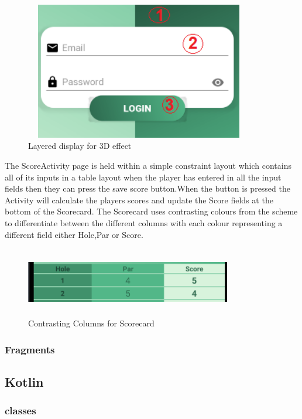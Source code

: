 \begin{figure}[H]
    \centering
    \includegraphics[width=10cm, height = 6cm]{img/login_layers.PNG}
    \caption{Layered display for 3D effect}
    \label{fig:altas config}
\end{figure}

The ScoreActivity page is held within a simple constraint layout which contains all of its inputs in a table layout when the player has entered in all the input fields then they can press the save score button.When the button is pressed the Activity will calculate the players scores and update the Score fields at the bottom of the Scorecard. The Scorecard uses contrasting colours from the scheme to differentiate between the different columns with each colour representing a different field either Hole,Par or Score.


\begin{figure}[H]
    \centering
    \includegraphics[width=9cm, height = 3cm]{img/score_colours.PNG}
    \caption{Contrasting Columns for Scorecard}
    \label{fig:altas config}
\end{figure}
\subsubsection{Fragments}
\subsection{Kotlin}
\subsubsection{classes}
